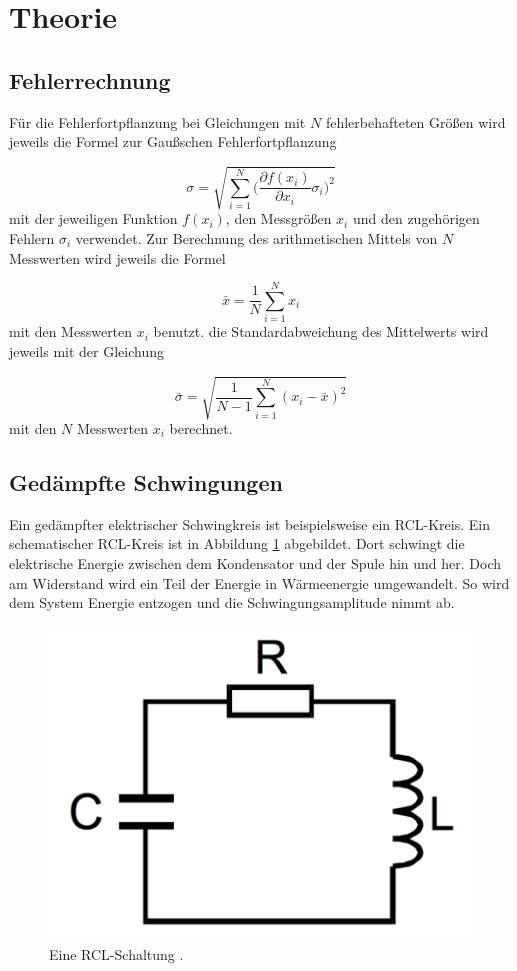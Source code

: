 \section{Theorie}
\label{sec:Theorie}

\subsection{Fehlerrechnung}

Für die Fehlerfortpflanzung bei Gleichungen mit $N$ fehlerbehafteten Größen
wird jeweils die Formel zur Gaußschen Fehlerfortpflanzung

\begin{equation}
  \sigma = \sqrt{\sum_{i=1}^{N}\biggl(\frac{\partial f(x_i)}{\partial x_i}
  \sigma_i\biggr)^2}
\end{equation}
mit der jeweiligen Funktion $f(x_i)$, den Messgrößen $x_i$ und den
zugehörigen Fehlern $\sigma_i$ verwendet.
Zur Berechnung des arithmetischen Mittels von $N$ Messwerten wird jeweils die
Formel

\begin{equation}
  \bar{x} = \frac{1}{N}\sum_{i=1}^{N}x_i
\end{equation}
mit den Messwerten $x_i$ benutzt.
die Standardabweichung des Mittelwerts wird jeweils mit der Gleichung

\begin{equation}
  \bar{\sigma} = \sqrt{\frac{1}{N-1}\sum_{i=1}^{N}(x_i - \bar{x})^2}
\end{equation}
mit den $N$ Messwerten $x_i$ berechnet.

\subsection{Gedämpfte Schwingungen}
\label{sec:gedschw}

Ein gedämpfter elektrischer Schwingkreis ist beispielsweise ein RCL-Kreis.
 Ein schematischer RCL-Kreis ist
in Abbildung \ref{fig:rcl} abgebildet.
Dort schwingt die elektrische Energie zwischen dem Kondensator und der Spule
hin und her. Doch am Widerstand wird ein Teil der Energie in Wärmeenergie umgewandelt.
So wird dem System Energie entzogen und die Schwingungsamplitude nimmt ab.

\begin{figure}[h]
  \centering
  \includegraphics[height = 4 cm]{RCL.pdf}
  \caption{Eine RCL-Schaltung \cite{anleitung}.}
  \label{fig:rcl}
\end{figure}

